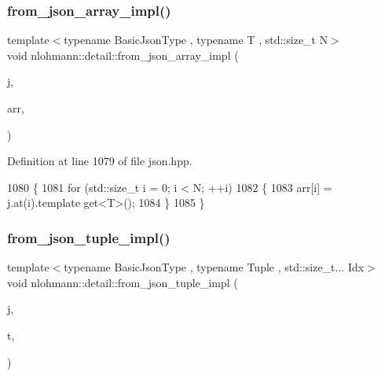 \subsubsection{\texorpdfstring{from\+\_\+json\+\_\+array\+\_\+impl()}{from\_json\_array\_impl()}\hspace{0.1cm}{\footnotesize\ttfamily [3/3]}}
{\footnotesize\ttfamily template$<$typename Basic\+Json\+Type , typename T , std\+::size\+\_\+t N$>$ \\
void nlohmann\+::detail\+::from\+\_\+json\+\_\+array\+\_\+impl (\begin{DoxyParamCaption}\item[{const Basic\+Json\+Type \&}]{j,  }\item[{\hyperlink{namespacenlohmann_1_1detail_a1ed8fc6239da25abcaf681d30ace4985af1f713c9e000f5d3f280adbd124df4f5}{std\+::array}$<$ T, N $>$ \&}]{arr,  }\item[{\hyperlink{structnlohmann_1_1detail_1_1priority__tag}{priority\+\_\+tag}$<$ 2 $>$}]{ }\end{DoxyParamCaption})}



Definition at line 1079 of file json.\+hpp.


\begin{DoxyCode}
1080 \{
1081     \textcolor{keywordflow}{for} (std::size\_t i = 0; i < N; ++i)
1082     \{
1083         arr[i] = j.at(i).template get<T>();
1084     \}
1085 \}
\end{DoxyCode}
\mbox{\label{namespacenlohmann_1_1detail_a28253915d9db4a0112d60eaee0422949}} 
\subsubsection{\texorpdfstring{from\+\_\+json\+\_\+tuple\+\_\+impl()}{from\_json\_tuple\_impl()}}
{\footnotesize\ttfamily template$<$typename Basic\+Json\+Type , typename Tuple , std\+::size\+\_\+t... Idx$>$ \\
void nlohmann\+::detail\+::from\+\_\+json\+\_\+tuple\+\_\+impl (\begin{DoxyParamCaption}\item[{const Basic\+Json\+Type \&}]{j,  }\item[{Tuple \&}]{t,  }\item[{\hyperlink{structnlohmann_1_1detail_1_1index__sequence}{index\+\_\+sequence}$<$ Idx... $>$}]{ }\end{DoxyParamCaption})}




